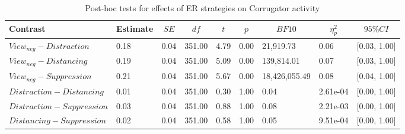 \documentclass[
  man,floatsintext]{apa6}
\begin{document}
\begin{table}[H]

\begin{center}
\begin{threeparttable}

\caption{\label{tab:SupplEffectER}Post-hoc tests for effects of ER strategies on Corrugator activity}

\footnotesize{

\begin{tabular}{lllllllll}
\toprule
Contrast & \multicolumn{1}{c}{Estimate} & \multicolumn{1}{c}{$SE$} & \multicolumn{1}{c}{$df$} & \multicolumn{1}{c}{$t$} & \multicolumn{1}{c}{$p$} & \multicolumn{1}{c}{$BF10$} & \multicolumn{1}{c}{$\eta_{p}^{2}$} & \multicolumn{1}{c}{$95\% CI$}\\
\midrule
$View_{neg} - Distraction$ & 0.18 & 0.04 & 351.00 & 4.79 & 0.00 & 21,919.73 & 0.06 & {}[0.03, 1.00]\\
$View_{neg} - Distancing$ & 0.19 & 0.04 & 351.00 & 5.09 & 0.00 & 139,814.01 & 0.07 & {}[0.03, 1.00]\\
$View_{neg} - Suppression$ & 0.21 & 0.04 & 351.00 & 5.67 & 0.00 & 18,426,055.49 & 0.08 & {}[0.04, 1.00]\\
$Distraction - Distancing$ & 0.01 & 0.04 & 351.00 & 0.30 & 1.00 & 0.04 & 2.61e-04 & {}[0.00, 1.00]\\
$Distraction - Suppression$ & 0.03 & 0.04 & 351.00 & 0.88 & 1.00 & 0.08 & 2.21e-03 & {}[0.00, 1.00]\\
$Distancing - Suppression$ & 0.02 & 0.04 & 351.00 & 0.58 & 1.00 & 0.05 & 9.51e-04 & {}[0.00, 1.00]\\
\bottomrule
\end{tabular}

}

\end{threeparttable}
\end{center}

\end{table}
\end{document}
